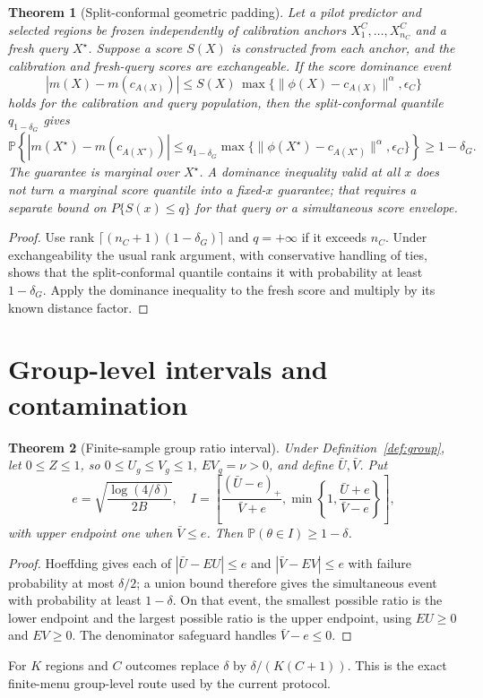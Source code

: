\documentclass[11pt,a4paper]{article}
\numberwithin{equation}{section}
\newtheorem{theorem}{Theorem}[section]
\theoremstyle{definition}\newtheorem{definition}[theorem]{Definition}
\theoremstyle{remark}\newtheorem{remark}[theorem]{Remark}
\begin{document}
\begin{theorem}[Split-conformal geometric padding]\label{thm:conformalgeo}
Let a pilot predictor and selected regions be frozen independently of calibration anchors
$X_1^C,\ldots,X_{n_C}^C$ and a fresh query $X^\star$. Suppose a score $S(X)$ is constructed
from each anchor, and the calibration and fresh-query scores are exchangeable. If the score
dominance event
\[
 |m(X)-m(c_{A(X)})|\le S(X)\,
 \max\{\|\phi(X)-c_{A(X)}\|^\alpha,\epsilon_C\}
\]
holds for the calibration and query population, then the split-conformal quantile
$q_{1-\delta_G}$ gives
\[
 \mathbb P\!\left\{|m(X^\star)-m(c_{A(X^\star)})|
 \le q_{1-\delta_G}\max\{\|\phi(X^\star)-c_{A(X^\star)}\|^\alpha,\epsilon_C\}\right\}
 \ge1-\delta_G.
\]
The guarantee is marginal over $X^\star$. A dominance inequality valid at all $x$ does not turn a marginal score quantile into a fixed-$x$ guarantee; that requires a separate bound on $P\{S(x)\le q\}$ for that query or a simultaneous score envelope.
\end{theorem}
\begin{proof}
Use rank $\lceil(n_C+1)(1-\delta_G)\rceil$ and $q=+\infty$ if it exceeds $n_C$. Under exchangeability the usual rank argument, with conservative handling of ties, shows that
the split-conformal quantile contains it with probability at least $1-\delta_G$. Apply the
dominance inequality to the fresh score and multiply by its known distance factor.
\end{proof}

\section{Group-level intervals and contamination}\label{sec:groups}
\begin{theorem}[Finite-sample group ratio interval]\label{thm:ratiofinite}
Under Definition~\ref{def:group}, let $0\le Z\le1$, so $0\le U_g\le V_g\le1$, $EV_g=\nu>0$, and define $\bar U,\bar V$. Put
\[
 e=\sqrt{\frac{\log(4/\delta)}{2B}},\quad
 I=\left[\frac{(\bar U-e)_+}{\bar V+e},
 \min\left\{1,\frac{\bar U+e}{\bar V-e}\right\}\right],
\]
with upper endpoint one when $\bar V\le e$. Then $\mathbb P(\theta\in I)\ge1-\delta$.
\end{theorem}
\begin{proof}
Hoeffding gives each of $|\bar U-EU|\le e$ and $|\bar V-EV|\le e$ with failure probability at most $\delta/2$; a union bound therefore gives the simultaneous event with probability at least $1-\delta$. On that event, the smallest possible ratio is the lower endpoint and the largest possible ratio is the upper endpoint, using $EU\ge0$ and $EV\ge0$. The denominator safeguard handles $\bar V-e\le0$.
\end{proof}
For $K$ regions and $C$ outcomes replace $\delta$ by $\delta/(K(C+1))$. This is the exact finite-menu group-level route used by the current protocol.
\end{document}
